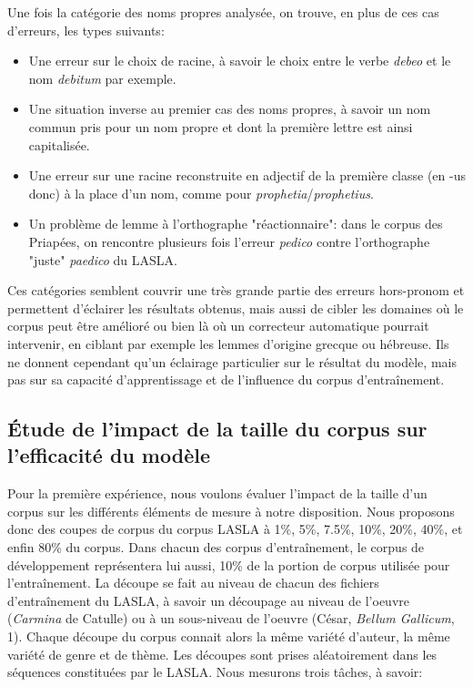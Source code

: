 Une fois la catégorie des noms propres analysée, on trouve, en plus de ces cas d'erreurs, les types suivants:
\begin{itemize}
    \item Une erreur sur le choix de racine, à savoir le choix entre le verbe \textit{debeo} et le nom \textit{debitum} par exemple.
    \item Une situation inverse au premier cas des noms propres, à savoir un nom commun pris pour un nom propre et dont la première lettre est ainsi capitalisée.
    \item Une erreur sur une racine reconstruite en adjectif de la première classe (en -us donc) à la place d'un nom, comme pour \textit{prophetia}/\textit{prophetius}.
    \item Un problème de lemme à l'orthographe "réactionnaire": dans le corpus des Priapées, on rencontre plusieurs fois l'erreur \textit{pedico} contre l'orthographe "juste" \textit{paedico} du LASLA.
\end{itemize}

Ces catégories semblent couvrir une très grande partie des erreurs hors-pronom et permettent d'éclairer les résultats obtenus, mais aussi de cibler les domaines où le corpus peut être amélioré ou bien là où un correcteur automatique pourrait intervenir, en ciblant par exemple les lemmes d'origine grecque ou hébreuse. Ils ne donnent cependant qu'un éclairage particulier sur le résultat du modèle, mais pas sur sa capacité d'apprentissage et de l'influence du corpus d'entraînement.

\subsection{Étude de l'impact de la taille du corpus sur l'efficacité du modèle}
\label{lemmatisation:extensibilite:tailles}

Pour la première expérience, nous voulons évaluer l'impact de la taille d'un corpus sur les différents éléments de mesure à notre disposition. Nous proposons donc des coupes de corpus du corpus LASLA à 1\%, 5\%, 7.5\%, 10\%, 20\%, 40\%, et enfin 80\% du corpus. Dans chacun des corpus d'entraînement, le corpus de développement représentera lui aussi, 10\% de la portion de corpus utilisée pour l'entraînement. La découpe se fait au niveau de chacun des fichiers d'entraînement du LASLA, à savoir un découpage au niveau de l'oeuvre (\textit{Carmina} de Catulle) ou à un sous-niveau de l'oeuvre (César, \textit{Bellum Gallicum}, 1). Chaque découpe du corpus connait alors la même variété d'auteur, la même variété de genre et de thème. Les découpes sont prises aléatoirement dans les séquences constituées par le LASLA. Nous mesurons trois tâches, à savoir:


